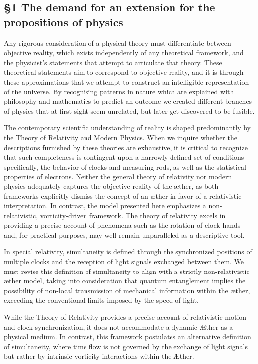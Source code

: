 \subsection{\S 1 The demand for an extension for the propositions of physics}\label{subsec:extension-physics}

Any rigorous consideration of a physical theory must differentiate between objective reality, which exists independently of any theoretical framework, and the physicist's statements that attempt to articulate that theory.
These theoretical statements aim to correspond to objective reality, and it is through these approximations that we attempt to construct an intelligible representation of the universe.
By recognising patterns in nature which are explained with philosophy and mathematics to predict an outcome we created different branches of physics that at first sight seem unrelated, but later get discovered to be fusible.

The contemporary scientific understanding of reality is shaped predominantly by the Theory of Relativity and Modern Physics.
When we inquire whether the descriptions furnished by these theories are exhaustive, it is critical to recognize that such completeness is contingent upon a narrowly defined set of conditions—specifically, the behavior of clocks and measuring rods, as well as the statistical properties of electrons.
Neither the general theory of relativity nor modern physics adequately captures the objective reality of the æther, as both frameworks explicitly dismiss the concept of an æther in favor of a relativistic interpretation.
In contrast, the model presented here emphasizes a non-relativistic, vorticity-driven framework.
The theory of relativity excels in providing a precise account of phenomena such as the rotation of clock hands and, for practical purposes, may well remain unparalleled as a descriptive tool.

In special relativity, simultaneity is defined through the synchronized positions of multiple clocks and the reception of light signals exchanged between them.
We must revise this definition of simultaneity to align with a strictly non-relativistic æther model, taking into consideration that quantum entanglement implies the possibility of non-local transmission of mechanical information within the æther, exceeding the conventional limits imposed by the speed of light.

While the Theory of Relativity provides a precise account of relativistic motion and clock synchronization, it does not accommodate a dynamic Æther as a physical medium.
In contrast, this framework postulates an alternative definition of simultaneity, where time flow is not governed by the exchange of light signals but rather by intrinsic vorticity interactions within the Æther.

